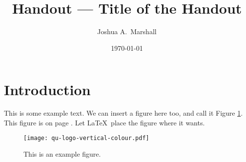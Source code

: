 \documentclass[letterpaper,fleqn,oneside]{qu-handout}
\begin{document}
\pagestyle{plain}


\renewcommand{\institution}{Queen's University at Kingston, Canada}
\renewcommand{\coursetitle}{ELEC 443 Linear Control Systems}
\renewcommand{\term}{Fall 2019}


\title{Handout --- Title of the Handout}
\author{Joshua A.~Marshall}
\date{\today}


\thispagestyle{title}

\begin{bshaded}
  \begin{center}
    \Large\bf\thetitle
  \end{center}
\end{bshaded}


\tableofcontents


\section{Introduction}

This is some example text.  We can insert a figure here too, and call it Figure \ref{fig:example}.  This figure is on page \pageref{fig:example}.  Let \LaTeX\ place the figure where it wants.  

\begin{figure}
  \begin{center}
    \texttt{[image: qu-logo-vertical-colour.pdf]}
    \caption{This is an example figure.}
    \label{fig:example}
  \end{center}
\end{figure}
\end{document}
